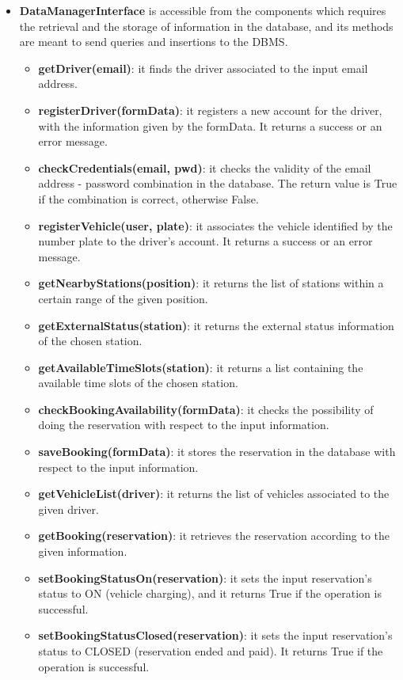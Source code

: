 \documentclass[../main.tex]{subfiles}
\begin{document}
\begin{itemize}
    \item \textbf{DataManagerInterface} is accessible from the components which requires the retrieval and the storage of information in the database, and its methods are meant to send queries and insertions to the DBMS. 
    \begin{itemize}
        \item \textbf{getDriver(email)}: it finds the driver associated to the input email address.
        \item \textbf{registerDriver(formData)}: it registers a new account for the driver, with the information given by the formData. It returns a success or an error message.
        \item \textbf{checkCredentials(email, pwd)}: it checks the validity of the email address - password combination in the database. The return value is True if the combination is correct, otherwise False.
        \item \textbf{registerVehicle(user, plate)}: it associates the vehicle identified by the number plate to the driver's account.  It returns a success or an error message.
        \item \textbf{getNearbyStations(position)}: it returns the list of stations within a certain range of the given position. 
        \item \textbf{getExternalStatus(station)}: it returns the external status information of the chosen station.
        \item \textbf{getAvailableTimeSlots(station)}: it returns a list containing the available time slots of the chosen station.
        \item \textbf{checkBookingAvailability(formData)}: it checks the possibility of doing the reservation with respect to the input information.
        \item \textbf{saveBooking(formData)}: it stores the reservation in the database with respect to the input information.
        \item \textbf{getVehicleList(driver)}: it returns the list of vehicles associated to the given driver.
        \item \textbf{getBooking(reservation)}: it retrieves the reservation according to the given information.
        \item \textbf{setBookingStatusOn(reservation)}: it sets the input reservation's status to ON (vehicle charging), and it returns True if the operation is successful.
        \item \textbf{setBookingStatusClosed(reservation)}: it sets the input reservation's status to CLOSED (reservation ended and paid). It returns True if the operation is successful.

\end{itemize}
\end{itemize}
\end{document}
